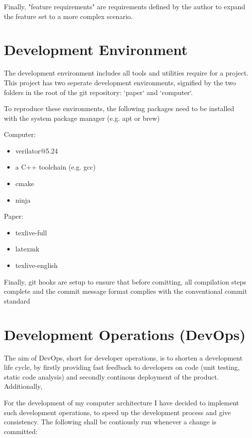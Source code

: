 Finally, "feature requirements" are requirements defined by the author to expand the feature set to a more complex scenario. 

\newtheorem{turing-requirement}{Turing Req.}[subsection]
\newtheorem{arch-requirement}{Arch. Req.}[subsection]
\newtheorem{feat-requirement}{Feat. Req.}[subsection]

\section{Development Environment}
The development environment includes all tools and utilities require for a project. This project has two seperate development environments, signified by the two folders in the root of the git repository: `paper` and `computer`. 

To reproduce these environments, the following packages need to be installed with the system package manager (e.g. apt or brew) 

Computer: 
\begin{itemize}
  \item verilator@5.24
  \item a C++ toolchain (e.g. gcc)
  \item cmake
  \item ninja
\end{itemize}

Paper:
\begin{itemize}
  \item texlive-full
  \item latexmk
  \item texlive-english
\end{itemize}


Finally, git hooks are setup to ensure that before comitting, all compilation steps complete and the commit message format complies with the conventional commit standard \cite{conventionalcommit}

\section{Development Operations (DevOps)}
The aim of DevOps, short for developer operations, is to shorten a development life cycle, by firstly providing fast feedback to developers on code (unit testing, static code analysis) and secondly continous deployment of the product. Additionally,   

For the development of my computer architecture I have decided to implement such development operations, to speed up the development process and give consistency. The following shall be contiously run whenever a change is committed:  

